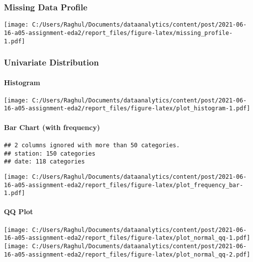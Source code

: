 \documentclass[
]{article}
\begin{document}
\hypertarget{missing-data-profile}{%
\subsubsection{Missing Data Profile}\label{missing-data-profile}}

\texttt{[image: C:/Users/Raghul/Documents/dataanalytics/content/post/2021-06-16-a05-assignment-eda2/report\_files/figure-latex/missing\_profile-1.pdf]}

\hypertarget{univariate-distribution}{%
\subsubsection{Univariate Distribution}\label{univariate-distribution}}

\hypertarget{histogram}{%
\paragraph{Histogram}\label{histogram}}

\texttt{[image: C:/Users/Raghul/Documents/dataanalytics/content/post/2021-06-16-a05-assignment-eda2/report\_files/figure-latex/plot\_histogram-1.pdf]}

\hypertarget{bar-chart-with-frequency}{%
\paragraph{Bar Chart (with frequency)}\label{bar-chart-with-frequency}}

\begin{verbatim}
## 2 columns ignored with more than 50 categories.
## station: 150 categories
## date: 118 categories
\end{verbatim}

\texttt{[image: C:/Users/Raghul/Documents/dataanalytics/content/post/2021-06-16-a05-assignment-eda2/report\_files/figure-latex/plot\_frequency\_bar-1.pdf]}

\hypertarget{qq-plot}{%
\paragraph{QQ Plot}\label{qq-plot}}

\texttt{[image: C:/Users/Raghul/Documents/dataanalytics/content/post/2021-06-16-a05-assignment-eda2/report\_files/figure-latex/plot\_normal\_qq-1.pdf]}
\texttt{[image: C:/Users/Raghul/Documents/dataanalytics/content/post/2021-06-16-a05-assignment-eda2/report\_files/figure-latex/plot\_normal\_qq-2.pdf]}
\end{document}
